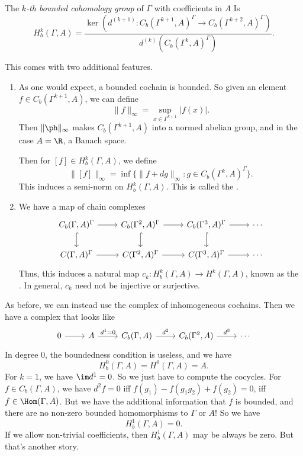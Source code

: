 \documentclass[a4paper]{article}
\begin{document}
\begin{defi}
  The \emph{$k$-th bounded cohomology group} of $\Gamma$ with coefficients in $A$ Is
  \[
    H_b^k(\Gamma, A) = \frac{\ker (d^{(k + 1)} \colon C_b(\Gamma^{k + 1}, A)^\Gamma \to C_b(\Gamma^{k + 2}, A)^\Gamma)}{d^{(k)}(C_b(\Gamma^k, A)^\Gamma)}.
  \]
\end{defi}

This comes with two additional features.
\begin{enumerate}
  \item As one would expect, a bounded cochain is bounded. So given an element $f \in C_b(\Gamma^{k + 1}, A)$, we can define
    \[
      \|f\|_\infty = \sup_{x \in \Gamma^{k + 1}} |f(x)|.
    \]
    Then $\|\ph\|_\infty$ makes $C_b(\Gamma^{k + 1}, A)$ into a normed abelian group, and in the case $A = \R$, a Banach space.

    Then for $[f] \in H^k_b(\Gamma, A)$, we define
    \[
      \|[f]\|_\infty = \inf \{ \|f + d g\|_\infty : g \in C_b(\Gamma^k, A)^\Gamma\}.
    \]
    This induces a semi-norm on $H^k_b(\Gamma, A)$. This is called the .
  \item We have a map of chain complexes
    \[
      \begin{tikzcd}
        C_b(\Gamma, A)^\Gamma \ar[r] \ar[d, hook] & C_b(\Gamma^2, A)^\Gamma \ar[r] \ar[d, hook] & C_b(\Gamma^3, A)^\Gamma \ar[r] \ar[d, hook] & \cdots\\
        C(\Gamma, A)^\Gamma \ar[r] & C(\Gamma^2, A)^\Gamma \ar[r] & C(\Gamma^3, A)^\Gamma \ar[r] & \cdots
      \end{tikzcd}
    \]
    Thus, this induces a natural map $c_k\colon H^k_b (\Gamma, A) \to H^k(\Gamma, A)$, known as the . In general, $c_k$ need not be injective or surjective.
\end{enumerate}

As before, we can instead use the complex of inhomogeneous cochains. Then we have a complex that looks like
\[
  \begin{tikzcd}
    0 \ar[r] & A \ar[r, "d^1 = 0"] & C_b(\Gamma, A) \ar[r, "d^2"] & C_b(\Gamma^2, A) \ar[r, "d^3"] & \cdots
  \end{tikzcd}
\]
In degree $0$, the boundedness condition is useless, and we have
\[
  H_b^0(\Gamma, A) = H^0(\Gamma, A) = A.
\]
For $k = 1$, we have $\im d^1 = 0$. So we just have to compute the cocycles. For $f \in C_b(\Gamma, A)$, we have $d^2 f = 0$ iff $f(g_1) - f(g_1 g_2) + f(g_2) = 0$, iff $f \in \Hom(\Gamma, A)$. But we have the additional information that $f$ is bounded, and there are no non-zero bounded homomorphisms to $\Gamma$ or $A$! So we have
\[
  H_b^1(\Gamma, A) = 0.
\]
If we allow non-trivial coefficients, then $H^1_b(\Gamma, A)$ may be always be zero. But that's another story.
\end{document}
